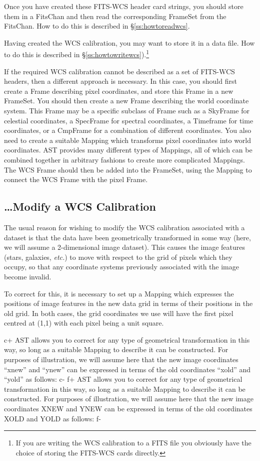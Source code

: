 \documentclass[twoside,11pt]{article}
\newcommand{\secref}[1]{\S\ref{#1}}
\newcommand{\secref}[1]{\ref{#1}}
\begin{document}
Once you have created these FITS-WCS header card strings, you should
store them in a FitsChan and then read the corresponding FrameSet from the
FitsChan. How to do this is described in \secref{ss:howtoreadwcs}.

Having created the WCS calibration, you may want to store it in a data
file. How to do this is described in \secref{ss:howtowritewcs}).\footnote{If
you are writing the WCS calibration to a FITS file you obviously
have the choice of storing the FITS-WCS cards directly.}

If the required WCS calibration cannot be described as a set of FITS-WCS
headers, then a different approach is necessary. In this case, you should
first create a Frame describing pixel coordinates, and store this Frame
in a new FrameSet. You should then create a new Frame describing the
world coordinate system. This Frame may be a specific subclass of Frame such
as a SkyFrame for celestial coordinates, a SpecFrame for spectral
coordinates, a Timeframe for time coordinates, or a CmpFrame for a combination
of different coordinates.
You also need to create a suitable Mapping which transforms pixel
coordinates into world coordinates. AST provides many different types of
Mappings, all of which can be combined together in arbitrary fashions to
create more complicated Mappings. The WCS Frame should then be added into
the FrameSet, using the Mapping to connect the WCS Frame with the pixel
Frame.

\subsection{\label{ss:howtomodifywcs}\ldots Modify a WCS Calibration}

The usual reason for wishing to modify the WCS calibration associated
with a dataset is that the data have been geometrically transformed in
some way (here, we will assume a 2-dimensional image dataset). This
causes the image features (stars, galaxies, {\em{etc.}}) to move with
respect to the grid of pixels which they occupy, so that any
coordinate systems previously associated with the image become
invalid.

To correct for this, it is necessary to set up a Mapping which
expresses the positions of image features in the new data grid in
terms of their positions in the old grid. In both cases, the grid
coordinates we use will have the first pixel centred at (1,1) with
each pixel being a unit square.

c+
AST allows you to correct for any type of geometrical transformation
in this way, so long as a suitable Mapping to describe it can be
constructed. For purposes of illustration, we will assume here that
the new image coordinates ``xnew'' and ``ynew'' can be expressed in
terms of the old coordinates ``xold'' and ``yold'' as follows:
c-
f+
AST allows you to correct for any type of geometrical transformation
in this way, so long as a suitable Mapping to describe it can be
constructed. For purposes of illustration, we will assume here that
the new image coordinates XNEW and YNEW can be expressed in terms of
the old coordinates XOLD and YOLD as follows:
f-
\end{document}
